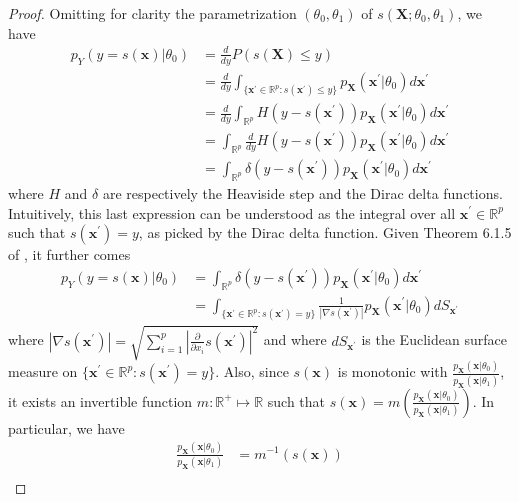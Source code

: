 \documentclass[12pt]{article}
\numberwithin{equation}{section}
\theoremstyle{plain}
\begin{document}
\begin{proof}
Omitting for clarity the parametrization $(\theta_0,\theta_1)$ of $s(\mathbf{X};\theta_0,\theta_1)$, we have
\begin{align}
p_Y(y=s(\mathbf{x})|\theta_0) &= \frac{d}{dy} P(s(\mathbf{X}) \leq y) \nonumber \\
&= \frac{d}{dy}  \int_{\{\mathbf{x}^\prime \in \mathbb{R}^p : s(\mathbf{x}^\prime) \leq y\}} p_\mathbf{X}(\mathbf{x}^\prime|\theta_0) d\mathbf{x}^\prime \nonumber \\
&= \frac{d}{dy} \int_{\mathbb{R}^p} H(y - s(\mathbf{x}^\prime)) p_\mathbf{X}(\mathbf{x}^\prime|\theta_0) d\mathbf{x}^\prime \nonumber \\
&= \int_{\mathbb{R}^p} \frac{d}{dy} H(y - s(\mathbf{x}^\prime)) p_\mathbf{X}(\mathbf{x}^\prime|\theta_0) d\mathbf{x}^\prime \nonumber \\
&= \int_{\mathbb{R}^p} \delta(y - s(\mathbf{x}^\prime)) p_\mathbf{X}(\mathbf{x}^\prime|\theta_0) d\mathbf{x}^\prime
\end{align}
where $H$ and $\delta$ are respectively the Heaviside step and the Dirac delta
functions. Intuitively, this last expression can be understood as the integral
over all $\mathbf{x}^\prime \in \mathbb{R}^p$ such that $s(\mathbf{x}^\prime) = y$, as picked
by the Dirac delta function. Given Theorem 6.1.5 of \citet{Hrmander1990},
it further comes
\begin{align}
p_Y(y=s(\mathbf{x})|\theta_0) &= \int_{\mathbb{R}^p} \delta(y - s(\mathbf{x}^\prime)) p_\mathbf{X}(\mathbf{x}^\prime|\theta_0) d\mathbf{x}^\prime \nonumber \\
&= \int_{\{\mathbf{x}^\prime \in \mathbb{R}^p : s(\mathbf{x}^\prime) = y\}} \frac{1}{|\nabla s(\mathbf{x}^\prime)|} p_\mathbf{X}(\mathbf{x}^\prime|\theta_0) dS_{\mathbf{x}^\prime} \label{eqn:hormander}
\end{align}
where $|\nabla s(\mathbf{x}^\prime)| = \sqrt{\sum_{i=1}^p |\frac{\partial}{\partial x_i} s(\mathbf{x}^\prime)|^2}$
and where $dS_{\mathbf{x}^\prime}$ is the Euclidean surface measure on $\{\mathbf{x}^\prime \in \mathbb{R}^p : s(\mathbf{x}^\prime) = y\}$.
Also, since $s(\mathbf{x})$ is monotonic with
$\frac{p_\mathbf{X}(\mathbf{x}|\theta_0)}{p_\mathbf{X}(\mathbf{x}|\theta_1)}$,
it exists an invertible function $m:\mathbb{R}^+ \mapsto \mathbb{R}$ such
that $s(\mathbf{x}) = m(\frac{p_\mathbf{X}(\mathbf{x}|\theta_0)}{p_\mathbf{X}(\mathbf{x}|\theta_1)})$.
In particular, we have
\begin{align}
\frac{p_\mathbf{X}(\mathbf{x}|\theta_0)}{p_\mathbf{X}(\mathbf{x}|\theta_1)} &= m^{-1}(s(\mathbf{x})) \nonumber \\

\end{align}
\end{proof}
\end{document}
